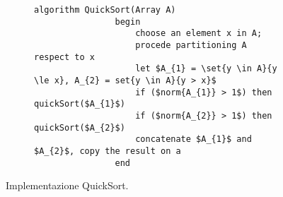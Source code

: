 \documentclass{subfiles}
\begin{document}
\begin{figure}[!h]
    \centering
    \begin{subfigure}[b]{0.65\textwidth}
        \begin{lstlisting}[language = algol]
            algorithm QuickSort(Array A)
                begin
                    choose an element x in A;
                    procede partitioning A respect to x
                    let $A_{1} = \set{y \in A}{y \le x}, A_{2} = set{y \in A}{y > x}$
                    if ($norm{A_{1}} > 1$) then quickSort($A_{1}$)
                    if ($norm{A_{2}} > 1$) then quickSort($A_{2}$)
                    concatenate $A_{1}$ and $A_{2}$, copy the result on a
                end
        \end{lstlisting}
    \end{subfigure}
    \caption{Implementazione QuickSort.}
    \label{Fig:4.6}
\end{figure}
\end{document}
